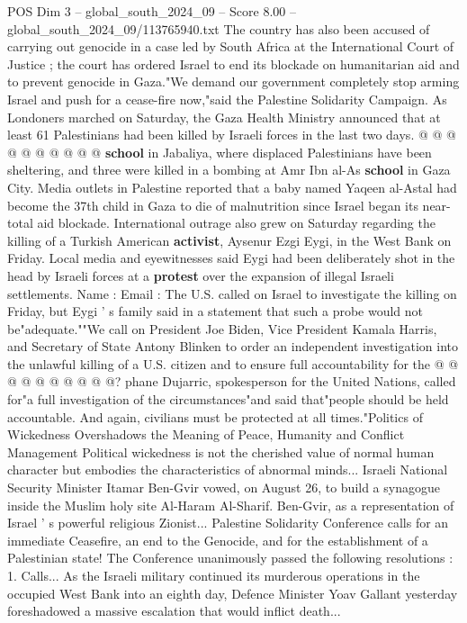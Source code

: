\begin{textsample}{POS Dim 3 – global\_south\_2024\_09 – Score 8.00 – global\_south\_2024\_09/113765940.txt}
The country has also been accused of carrying out genocide in a case led by South Africa at the International Court of Justice ; the court has ordered Israel to end its blockade on humanitarian aid and to prevent genocide in Gaza."We demand our government completely stop arming Israel and push for a cease-fire now,"said the Palestine Solidarity Campaign.
As Londoners marched on Saturday, the Gaza Health Ministry announced that at least 61 Palestinians had been killed by Israeli forces in the last two days. @ @ @ @ @ @ @ @ @ @ \textbf{school} in Jabaliya, where displaced Palestinians have been sheltering, and three were killed in a bombing at Amr Ibn al-As \textbf{school} in Gaza City.
Media outlets in Palestine reported that a baby named Yaqeen al-Astal had become the 37th child in Gaza to die of malnutrition since Israel began its near-total aid blockade.
International outrage also grew on Saturday regarding the killing of a Turkish American \textbf{activist}, Aysenur Ezgi Eygi, in the West Bank on Friday.
Local media and eyewitnesses said Eygi had been deliberately shot in the head by Israeli forces at a \textbf{protest} over the expansion of illegal Israeli settlements.
Name : Email : The U.S. called on Israel to investigate the killing on Friday, but Eygi ' s family said in a statement that such a probe would not be"adequate.""We call on President Joe Biden, Vice President Kamala Harris, and Secretary of State Antony Blinken to order an independent investigation into the unlawful killing of a U.S. citizen and to ensure full accountability for the @ @ @ @ @ @ @ @ @ @? phane Dujarric, spokesperson for the United Nations, called for"a full investigation of the circumstances"and said that"people should be held accountable.
And again, civilians must be protected at all times."Politics of Wickedness Overshadows the Meaning of Peace, Humanity and Conflict Management Political wickedness is not the cherished value of normal human character but embodies the characteristics of abnormal minds...
Israeli National Security Minister Itamar Ben-Gvir vowed, on August 26, to build a synagogue inside the Muslim holy site Al-Haram Al-Sharif.
Ben-Gvir, as a representation of Israel ' s powerful religious Zionist...
Palestine Solidarity Conference calls for an immediate Ceasefire, an end to the Genocide, and for the establishment of a Palestinian state!
The Conference unanimously passed the following resolutions : 1.
Calls...
As the Israeli military continued its murderous operations in the occupied West Bank into an eighth day, Defence Minister Yoav Gallant yesterday foreshadowed a massive escalation that would inflict death...

\end{textsample}

